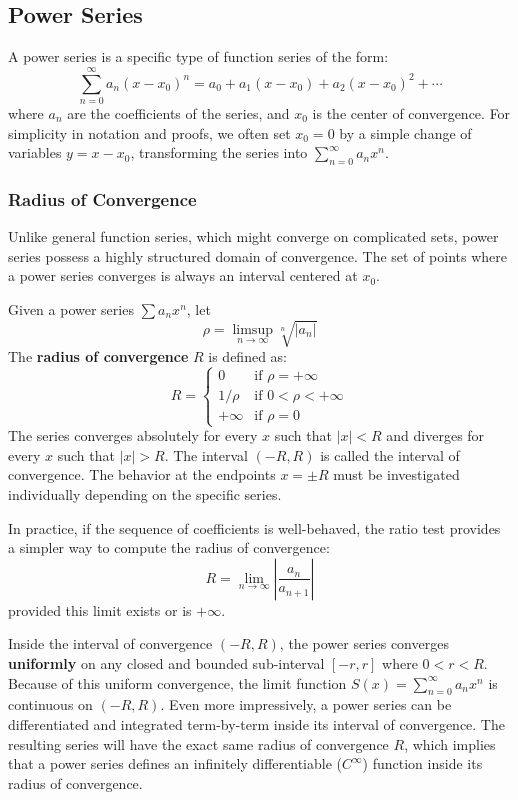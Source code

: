 \subsection{Power Series}

A power series is a specific type of function series of the form:
\[ \sum_{n=0}^{\infty} a_n (x - x_0)^n = a_0 + a_1(x - x_0) + a_2(x - x_0)^2 + \cdots \]
where $a_n$ are the coefficients of the series, and $x_0$ is the center of convergence. For simplicity in notation and proofs, we often set $x_0 = 0$ by a simple change of variables $y = x - x_0$, transforming the series into $\sum_{n=0}^{\infty} a_n x^n$.

\subsubsection{Radius of Convergence}

Unlike general function series, which might converge on complicated sets, power series possess a highly structured domain of convergence. The set of points where a power series converges is always an interval centered at $x_0$.

\newpage

\begin{theorem}
Given a power series $\sum a_n x^n$, let
\[ \rho = \limsup_{n \to \infty} \sqrt[n]{|a_n|} \]
The \textbf{radius of convergence} $R$ is defined as:
\[ R = \begin{cases} 0 & \text{if } \rho = +\infty \\ 1/\rho & \text{if } 0 < \rho < +\infty \\ +\infty & \text{if } \rho = 0 \end{cases} \]
The series converges absolutely for every $x$ such that $|x| < R$ and diverges for every $x$ such that $|x| > R$. The interval $(-R, R)$ is called the interval of convergence. The behavior at the endpoints $x = \pm R$ must be investigated individually depending on the specific series.
\end{theorem}

In practice, if the sequence of coefficients is well-behaved, the ratio test provides a simpler way to compute the radius of convergence:
\[ R = \lim_{n \to \infty} \left| \frac{a_n}{a_{n+1}} \right| \]
provided this limit exists or is $+\infty$.

\begin{property}
Inside the interval of convergence $(-R, R)$, the power series converges \textbf{uniformly} on any closed and bounded sub-interval $[-r, r]$ where $0 < r < R$.
Because of this uniform convergence, the limit function $S(x) = \sum_{n=0}^{\infty} a_n x^n$ is continuous on $(-R, R)$. Even more impressively, a power series can be differentiated and integrated term-by-term inside its interval of convergence. The resulting series will have the exact same radius of convergence $R$, which implies that a power series defines an infinitely differentiable ($C^\infty$) function inside its radius of convergence.
\end{property}


